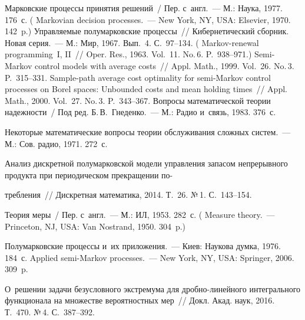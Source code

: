 \begin{multicols}{2}
{\small\frenchspacing
 {%
 \begin{thebibliography}{99}
 Марковские процессы принятия решений~/ Пер. с~англ.~--- 
М.: Наука, 1977. 176~с. ( Markovian decision processes.~--- New York, NY, USA: 
Elsevier, 1970. 142~p.)
 Управ\-ля\-емые полумарковские процессы~// 
Кибернетический сборник. Новая серия.~--- М.: Мир, 1967. Вып.~4. С.~97--134. 
(  Markov-renewal programming~I, II~// Oper. Res., 
1963. Vol.~11. No.\,6. P.~938--971.)
 Semi-Markov control 
models with average costs~// Appl. Math., 1999. Vol.~26. No.\,3. P.~315--331.
 Sample-path average cost 
optimality for semi-Markov control processes on Borel spaces: Unbounded costs 
and mean holding times~// Appl. Math., 2000. Vol.~27. No.\,3. P.~343--367.
Вопросы математической теории надежности~/ Под ред. Б.\,В.~Гнеденко.~--- М.: Радио и~связь, 1983. 376~с.

 Некоторые математические 
вопросы теории обслуживания сложных сис\-тем.~--- М.: Сов. радио, 1971. 272~с.

 Анализ дискретной 
полумарковской модели управления запасом непрерывного продукта при периодическом 
прекращении по-\linebreak\vspace*{-12pt}

\pagebreak

\noindent
требления~// Дискретная математика, 2014. Т.~26. №\,1. С.~143--154.

  Теория меры~/
 Пер. с~англ.~--- М.: ИЛ, 1953. 282~с.
( Measure theory.~--- Princeton, NJ, USA: Van Nostrand, 1950. 
304~p.)

 Полумарковские процессы и~их 
приложения.~--- Киев: Наукова думка, 1976.  184~с.
 Applied semi-Markov processes.~--- New 
York, NY, USA: Springer, 2006. 309~p.

 О~решении задачи безусловного экстремума для 
дроб\-но-ли\-ней\-но\-го интегрального функционала на множестве вероятностных мер~// 
Докл. Акад. наук, 2016. Т.~470. №\,4. С.~387--392.


\end{thebibliography}}}
\end{multicols}

